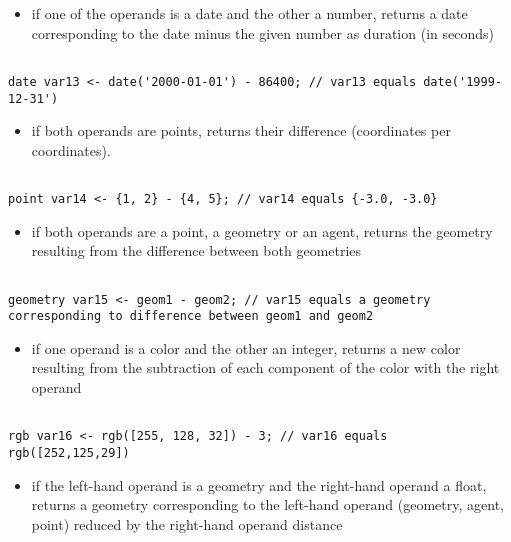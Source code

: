 \documentclass[]{book}
\providecommand{\tightlist}{%
  \setlength{\itemsep}{0pt}\setlength{\parskip}{0pt}}
\theoremstyle{definition}
\theoremstyle{definition}
\theoremstyle{definition}
\theoremstyle{remark}
\begin{document}
\begin{itemize}
\tightlist
\item
  if one of the operands is a date and the other a number, returns a
  date corresponding to the date minus the given number as duration (in
  seconds)
\end{itemize}

\begin{verbatim}
 
date var13 <- date('2000-01-01') - 86400; // var13 equals date('1999-12-31')
\end{verbatim}

\begin{itemize}
\tightlist
\item
  if both operands are points, returns their difference (coordinates per
  coordinates).
\end{itemize}

\begin{verbatim}
 
point var14 <- {1, 2} - {4, 5}; // var14 equals {-3.0, -3.0}
\end{verbatim}

\begin{itemize}
\tightlist
\item
  if both operands are a point, a geometry or an agent, returns the
  geometry resulting from the difference between both geometries
\end{itemize}

\begin{verbatim}
 
geometry var15 <- geom1 - geom2; // var15 equals a geometry corresponding to difference between geom1 and geom2
\end{verbatim}

\begin{itemize}
\tightlist
\item
  if one operand is a color and the other an integer, returns a new
  color resulting from the subtraction of each component of the color
  with the right operand
\end{itemize}

\begin{verbatim}
 
rgb var16 <- rgb([255, 128, 32]) - 3; // var16 equals rgb([252,125,29])
\end{verbatim}

\begin{itemize}
\tightlist
\item
  if the left-hand operand is a geometry and the right-hand operand a
  float, returns a geometry corresponding to the left-hand operand
  (geometry, agent, point) reduced by the right-hand operand distance
\end{itemize}
\end{document}
